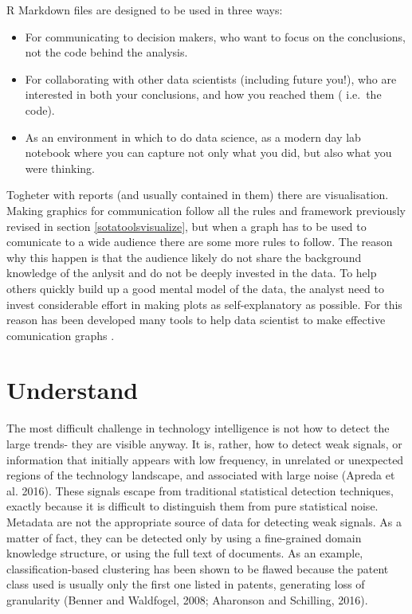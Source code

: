 \documentclass[]{book}
\begin{document}
R Markdown files are designed to be used in three ways:

\begin{itemize}
\item
  For communicating to decision makers, who want to focus on the
  conclusions, not the code behind the analysis.
\item
  For collaborating with other data scientists (including future you!),
  who are interested in both your conclusions, and how you reached them
  ( i.e.~the code).
\item
  As an environment in which to do data science, as a modern day lab
  notebook where you can capture not only what you did, but also what
  you were thinking.
\end{itemize}

Togheter with reports (and usually contained in them) there are
visualisation. Making graphics for communication follow all the rules
and framework previously revised in section \ref{sotatoolsvisualize},
but when a graph has to be used to comunicate to a wide audience there
are some more rules to follow. The reason why this happen is that the
audience likely do not share the background knowledge of the anlysit and
do not be deeply invested in the data. To help others quickly build up a
good mental model of the data, the analyst need to invest considerable
effort in making plots as self-explanatory as possible. For this reason
has been developed many tools to help data scientist to make effective
comunication graphs\citep[\citet{shiny2017}, \citet{plotly2017},
\citet{ggprah2018}, \citet{ICWSM09154}]{wickham2016ggplot2} .

\section{Understand}\label{sotadocumentsunderstand}

The most difficult challenge in technology intelligence is not how to
detect the large trends- they are visible anyway. It is, rather, how to
detect weak signals, or information that initially appears with low
frequency, in unrelated or unexpected regions of the technology
landscape, and associated with large noise (Apreda et al. 2016). These
signals escape from traditional statistical detection techniques,
exactly because it is difficult to distinguish them from pure
statistical noise. Metadata are not the appropriate source of data for
detecting weak signals. As a matter of fact, they can be detected only
by using a fine-grained domain knowledge structure, or using the full
text of documents. As an example, classification-based clustering has
been shown to be flawed because the patent class used is usually only
the first one listed in patents, generating loss of granularity (Benner
and Waldfogel, 2008; Aharonson and Schilling, 2016).
\end{document}
